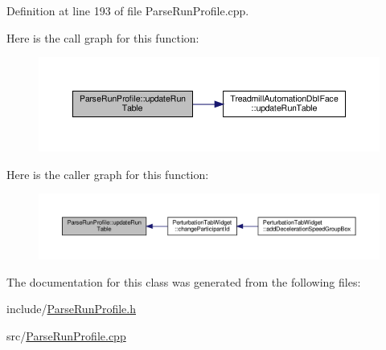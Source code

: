 Definition at line 193 of file Parse\+Run\+Profile.\+cpp.

Here is the call graph for this function\+:
\nopagebreak
\begin{figure}[H]
\begin{center}
\leavevmode
\includegraphics[width=350pt]{class_parse_run_profile_a01b21a62fe9b4e334fe0718416510340_cgraph}
\end{center}
\end{figure}
Here is the caller graph for this function\+:
\nopagebreak
\begin{figure}[H]
\begin{center}
\leavevmode
\includegraphics[width=350pt]{class_parse_run_profile_a01b21a62fe9b4e334fe0718416510340_icgraph}
\end{center}
\end{figure}


The documentation for this class was generated from the following files\+:\begin{DoxyCompactItemize}
\item 
include/\hyperlink{_parse_run_profile_8h}{Parse\+Run\+Profile.\+h}\item 
src/\hyperlink{_parse_run_profile_8cpp}{Parse\+Run\+Profile.\+cpp}\end{DoxyCompactItemize}
